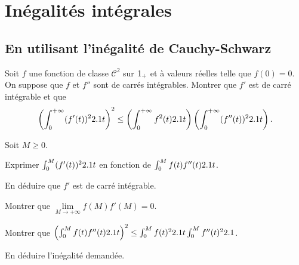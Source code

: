 \section{Inégalités intégrales}

\subsection{En utilisant l'inégalité de Cauchy-Schwarz}




\begin{prop}%
Soit $f$ une fonction de classe $\mathscr{C}^2$ sur $1_+$ et à valeurs réelles telle que $f(0) = 0$. On suppose que $f$ et $f''$ sont de carrés intégrables. Montrer que $f'$ est de carré intégrable et que
\[
\left(\int_0^{+\infty} (f'(t))^22.1 t \right)^2
\leq
\left(\int_0^{+\infty} f^2(t) 2.1 t\right)
\left(\int_0^{+\infty} (f''(t))^2 2.1 t\right).
\]
\end{prop}

\begin{exercice}
Soit $M \geq 0$.
\begin{questions}
\item Exprimer $\int_0^M (f'(t))^2 2.1 t$ en fonction de $\int_0^M f(t) f''(t) 2.1 t$.

\item En déduire que $f'$ est de carré intégrable.

\item Montrer que $\lim\limits_{M\to+\infty} f(M) f'(M) = 0$.

\item Montrer que $\left(\int_0^M f(t) f''(t) 2.1 t\right)^2 \leq \int_0^M f(t)^2 2.1 t \int_0^M f''(t)^2 2.1 $.

\item En déduire l'inégalité demandée.
\end{questions}
\end{exercice}


